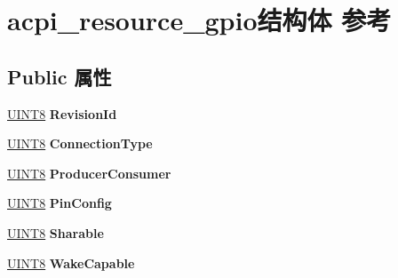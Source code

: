 \hypertarget{structacpi__resource__gpio}{}\section{acpi\+\_\+resource\+\_\+gpio结构体 参考}
\label{structacpi__resource__gpio}
\subsection*{Public 属性}
\begin{DoxyCompactItemize}
\item 
\mbox{\label{structacpi__resource__gpio_a3e7ec0ee0f4b6d947295780d5a450fd2}} 
\hyperlink{_processor_bind_8h_ab27e9918b538ce9d8ca692479b375b6a}{U\+I\+N\+T8} {\bfseries Revision\+Id}
\item 
\mbox{\label{structacpi__resource__gpio_acec46a3b207c3e22666645294f6ebc24}} 
\hyperlink{_processor_bind_8h_ab27e9918b538ce9d8ca692479b375b6a}{U\+I\+N\+T8} {\bfseries Connection\+Type}
\item 
\mbox{\label{structacpi__resource__gpio_a40ceffc903573bf0a08eedaab496de2e}} 
\hyperlink{_processor_bind_8h_ab27e9918b538ce9d8ca692479b375b6a}{U\+I\+N\+T8} {\bfseries Producer\+Consumer}
\item 
\mbox{\label{structacpi__resource__gpio_a73a9657557a63e430bebd7a049d1154f}} 
\hyperlink{_processor_bind_8h_ab27e9918b538ce9d8ca692479b375b6a}{U\+I\+N\+T8} {\bfseries Pin\+Config}
\item 
\mbox{\label{structacpi__resource__gpio_a16e2b281da9318ac75a3c9da72b1d0dc}} 
\hyperlink{_processor_bind_8h_ab27e9918b538ce9d8ca692479b375b6a}{U\+I\+N\+T8} {\bfseries Sharable}
\item 
\mbox{\label{structacpi__resource__gpio_af99e214aa354a1ee35d38af02b7b4438}} 
\hyperlink{_processor_bind_8h_ab27e9918b538ce9d8ca692479b375b6a}{U\+I\+N\+T8} {\bfseries Wake\+Capable}
\item 
\mbox{\label{structacpi__resource__gpio_ae05e1d45d31c449ede3671e0a9523dd8}} 

\end{DoxyCompactItemize}
